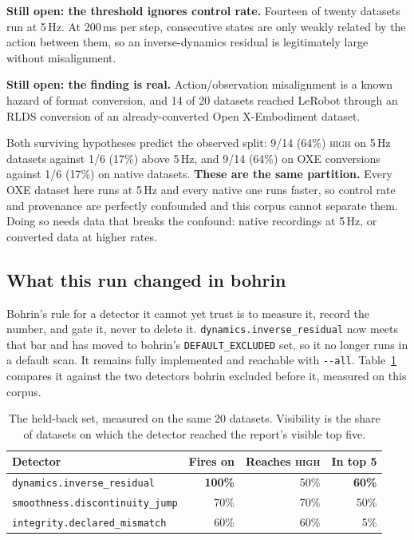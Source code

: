 \documentclass[10pt,a4paper]{article}
\newcommand{\dtr}[1]{\texttt{\small #1}}
\newcommand{\warn}[1]{\textcolor{critical}{\textbf{#1}}}
\begin{document}
\textbf{Still open: the threshold ignores control rate.} Fourteen of twenty datasets run at
5\,Hz. At 200\,ms per step, consecutive states are only weakly related by the action between
them, so an inverse-dynamics residual is legitimately large without misalignment.

\textbf{Still open: the finding is real.} Action/observation misalignment is a known hazard
of format conversion, and 14 of 20 datasets reached LeRobot through an RLDS conversion of an
already-converted Open X-Embodiment dataset.

Both surviving hypotheses predict the observed split: 9/14 (64\%) \textsc{high} on 5\,Hz
datasets against 1/6 (17\%) above 5\,Hz, and 9/14 (64\%) on OXE conversions against 1/6
(17\%) on native datasets. \textbf{These are the same partition.} Every OXE dataset here
runs at 5\,Hz and every native one runs faster, so control rate and provenance are perfectly
confounded and this corpus cannot separate them. Doing so needs data that breaks the
confound: native recordings at 5\,Hz, or converted data at higher rates.

\subsection{What this run changed in bohrin}
\label{sec:decided}

Bohrin's rule for a detector it cannot yet trust is to measure it, record the number, and
gate it, never to delete it. \dtr{dynamics.inverse\_residual} now meets that bar and has
moved to bohrin's \texttt{DEFAULT\_EXCLUDED} set, so it no longer runs in a default scan. It
remains fully implemented and reachable with \texttt{-{}-all}. Table~\ref{tab:excluded}
compares it against the two detectors bohrin excluded before it, measured on this corpus.

\begin{table}[tb]
\centering
\caption{The held-back set, measured on the same 20 datasets. Visibility is the share of
datasets on which the detector reached the report's visible top five.}
\label{tab:excluded}
\small
\begin{tabular}{lrrr}
\toprule
Detector & Fires on & Reaches \textsc{high} & In top 5 \\
\midrule
\dtr{dynamics.inverse\_residual}      & \warn{100\%} & 50\% & \warn{60\%} \\
\dtr{smoothness.discontinuity\_jump}  & 70\% & 70\% & 50\% \\
\dtr{integrity.declared\_mismatch}    & 60\% & 60\% & 5\% \\
\bottomrule
\end{tabular}
\end{table}
\end{document}
